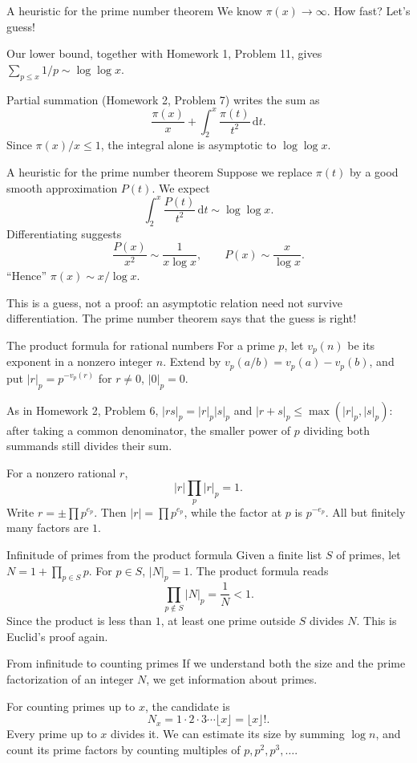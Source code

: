 \documentclass[aspectratio=169,11pt]{beamer}
\newcommand{\dd}{\,\mathrm d}
\begin{document}
\begin{frame}{A heuristic for the prime number theorem}
We know $\pi(x)\to\infty$. How fast? Let's guess!

Our lower bound, together with Homework 1, Problem 11, gives $\sum_{p\le x}1/p\sim\log\log x$.

Partial summation (Homework 2, Problem 7) writes the sum as
\[\frac{\pi(x)}x+\int_2^x\frac{\pi(t)}{t^2}\dd t.\]
Since $\pi(x)/x\le1$, the integral alone is asymptotic to $\log\log x$.
\end{frame}
\begin{frame}{A heuristic for the prime number theorem}
Suppose we replace $\pi(t)$ by a good smooth approximation $P(t)$. We expect
\[\int_2^x\frac{P(t)}{t^2}\dd t\sim\log\log x.\]
Differentiating suggests
\[\frac{P(x)}{x^2}\sim\frac1{x\log x},\qquad P(x)\sim\frac{x}{\log x}.\]
``Hence'' $\pi(x)\sim x/\log x$.

This is a guess, not a proof: an asymptotic relation need not survive differentiation. The prime number theorem says that the guess is right!
\end{frame}
\begin{frame}{The product formula for rational numbers}
For a prime $p$, let $v_p(n)$ be its exponent in a nonzero integer $n$. Extend by $v_p(a/b)=v_p(a)-v_p(b)$, and put $|r|_p=p^{-v_p(r)}$ for $r\ne0$, $|0|_p=0$.

As in Homework 2, Problem 6, $|rs|_p=|r|_p|s|_p$ and $|r+s|_p\le\max(|r|_p,|s|_p)$: after taking a common denominator, the smaller power of $p$ dividing both summands still divides their sum.

For a nonzero rational $r$,
\[|r|\prod_p|r|_p=1.\]
Write $r=\pm\prod p^{e_p}$. Then $|r|=\prod p^{e_p}$, while the factor at $p$ is $p^{-e_p}$. All but finitely many factors are $1$.
\end{frame}
\begin{frame}{Infinitude of primes from the product formula}
Given a finite list $S$ of primes, let $N=1+\prod_{p\in S}p$. For $p\in S$, $|N|_p=1$. The product formula reads
\[\prod_{p\notin S}|N|_p=\frac1N<1.\]
Since the product is less than $1$, at least one prime outside $S$ divides $N$. This is Euclid's proof again.
\end{frame}
\begin{frame}{From infinitude to counting primes}
If we understand both the size and the prime factorization of an integer $N$, we get information about primes.

For counting primes up to $x$, the candidate is
\[N_x=1\cdot2\cdot3\cdots\lfloor x\rfloor=\lfloor x\rfloor!.\]
Every prime up to $x$ divides it. We can estimate its size by summing $\log n$, and count its prime factors by counting multiples of $p,p^2,p^3,\ldots$.
\end{frame}
\end{document}
